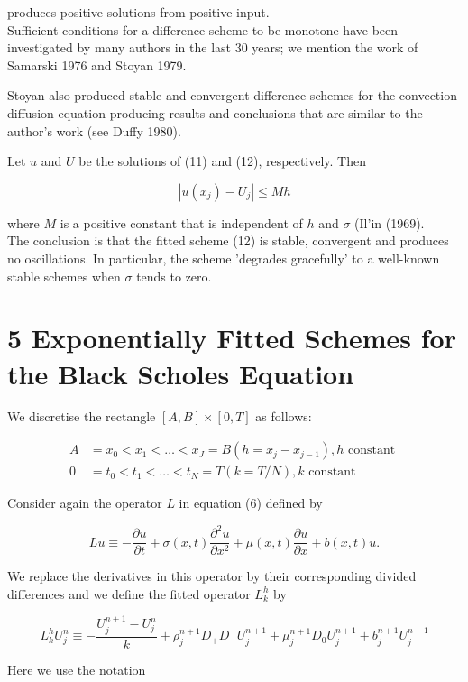 \documentclass[10pt]{article}
\begin{document}
produces positive solutions from positive input.\\
Sufficient conditions for a difference scheme to be monotone have been investigated by many authors in the last 30 years; we mention the work of Samarski 1976 and Stoyan 1979.

Stoyan also produced stable and convergent difference schemes for the convection-diffusion equation producing results and conclusions that are similar to the author's work (see Duffy 1980).

Let $u$ and $U$ be the solutions of (11) and (12), respectively. Then

$$
\left|u\left(x_{j}\right)-U_{j}\right| \leq M h
$$

where $M$ is a positive constant that is independent of $h$ and $\sigma$ (Il'in (1969).\\
The conclusion is that the fitted scheme (12) is stable, convergent and produces no oscillations. In particular, the scheme 'degrades gracefully' to a well-known stable schemes when $\sigma$ tends to zero.

\section*{5 Exponentially Fitted Schemes for the Black Scholes Equation}
We discretise the rectangle $[A, B] \times[0, T]$ as follows:

$$
\begin{aligned}
A & =x_{0}<x_{1}<\ldots<x_{J}=B\left(h=x_{j}-x_{j-1}\right), h \text { constant } \\
0 & =t_{0}<t_{1}<\ldots<t_{N}=T(k=T / N), k \text { constant }
\end{aligned}
$$

Consider again the operator $L$ in equation (6) defined by

$$
L u \equiv-\frac{\partial u}{\partial t}+\sigma(x, t) \frac{\partial^{2} u}{\partial x^{2}}+\mu(x, t) \frac{\partial u}{\partial x}+b(x, t) u .
$$

We replace the derivatives in this operator by their corresponding divided differences and we define the fitted operator $L_{k}^{h}$ by


\begin{equation*}
L_{k}^{h} U_{j}^{n} \equiv-\frac{U_{j}^{n+1}-U_{j}^{n}}{k}+\rho_{j}^{n+1} D_{+} D_{-} U_{j}^{n+1}+\mu_{j}^{n+1} D_{0} U_{j}^{n+1}+b_{j}^{n+1} U_{j}^{n+1} \tag{15}
\end{equation*}


Here we use the notation
\end{document}
